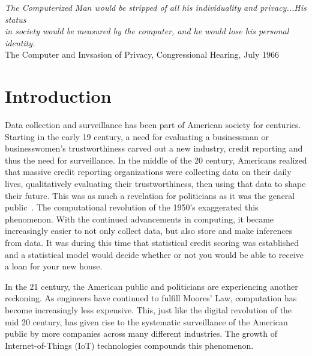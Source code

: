 \begin{center}
\textit{
The Computerized Man would be stripped of all his individuality and privacy...His status\\
in society would be measured by the computer, and he would lose his personal identity.} \\
The Computer and Invsasion of Privacy, Congressional Hearing, July 1966
\end{center}

\section{Introduction}

Data collection and surveillance has been part of American society for
centuries. Starting in the early 19 century, a need for evaluating a
businessman or businesswomen's trustworthiness carved out a new industry,
credit reporting and thus the need for surveillance. In the middle of the 20 century, Americans realized
that massive credit reporting organizations were collecting data on their
daily lives, qualitatively evaluating their trustworthiness, then using that
data to shape their future. This was as much a revelation for politicians as it
was the general public~\cite{lauer2017creditworthy}. The computational revolution of the 1950's exaggerated
this phenomenon. With the continued advancements in computing, it became
increasingly easier to not only collect data, but also store and make
inferences from data. It was during this time that statistical credit scoring
was established and a statistical model would decide whether or not you would
be able to receive a loan for your new house.

In the 21 century, the American public and politicians are experiencing
another reckoning. As engineers have continued to fulfill Moores' Law,
computation has become increasingly less expensive. This, just like the digital
revolution of the mid 20 century, has given rise to the systematic
surveillance of the American public by more companies across many different industries. The growth of Internet-of-Things (IoT)
technologies compounds this phenomenon.

